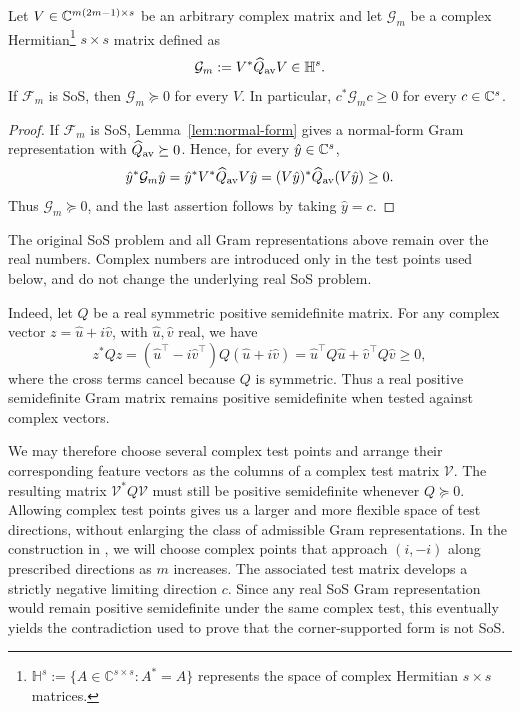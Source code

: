 \begin{lemma}\label{lem:finite-test}
Let $V\in\mathbb{C}^{m(2m-1)\times s}$ be an arbitrary complex matrix and let
$\mathcal G_m$ be a complex Hermitian\footnote{$\mathbb H^s:=\{A\in\mathbb C^{s\times s}:A^*=A\}$ represents the space of complex Hermitian $s\times s$ matrices.} $s\times s$ matrix defined as
\begin{equation}\label{eq:finite-compression}
 \mathcal G_m:=V^*\widehat Q_{\rm av}V\in\mathbb H^s.
\end{equation}
If $\mathcal F_m$ is SoS, then $\mathcal G_m\succeq0$ for every $V$.  In particular,
$c^*\mathcal G_mc\ge0$ for every $c\in\mathbb{C}^s$.
\end{lemma}

\begin{proof}
If $\mathcal F_m$ is SoS, Lemma~\ref{lem:normal-form} gives a normal-form
Gram representation with $\widehat Q_{\rm av}\succeq0$.  Hence, for every
$\hat y\in\mathbb{C}^s$,
\[
 \hat y^*\mathcal G_m\hat y
 =\hat y^*V^*\widehat Q_{\rm av}V\hat y
 =(V\hat y)^*\widehat Q_{\rm av}(V\hat y)\ge0.
\]
Thus $\mathcal G_m\succeq0$, and the last assertion follows by taking
$\hat y=c$.
\end{proof}

\begin{remark}
\label{rem:complex-test}
The original SoS problem and all Gram representations above remain over
the real numbers.  Complex numbers are introduced only in the test
points used below, and do not change the underlying real SoS problem.

Indeed, let $Q$ be a real symmetric positive semidefinite matrix.  For
any complex vector $z=\hat u+i\hat v$, with
$\hat u,\hat v$ real, we have
\[
 z^*Qz
 =
 (\hat u^\top-i\hat v^\top)Q(\hat u+i\hat v)
 =
 \hat u^\top Q\hat u+\hat v^\top Q\hat v\ge0,
\]
where the cross terms cancel because $Q$ is symmetric.  Thus a real
positive semidefinite Gram matrix remains positive semidefinite when
tested against complex vectors.

We may therefore choose several complex test points and arrange their
corresponding feature vectors as the columns of a complex test matrix
$\mathcal V$.  The resulting matrix
$
\mathcal V^*Q\mathcal V
$
must still be positive semidefinite whenever $Q\succeq0$.  Allowing
complex test points gives us a larger and more flexible space of test
directions, without enlarging the class of admissible Gram
representations. 
In the construction in , we  will choose complex points that approach
$(i,-i)$ along prescribed directions as $m$ increases.  The associated
test matrix develops a strictly negative limiting direction $c$.  Since any
real SoS Gram representation would remain positive semidefinite under
the same complex test, this eventually yields the contradiction used to
prove that the corner-supported form is not SoS.
\end{remark}


